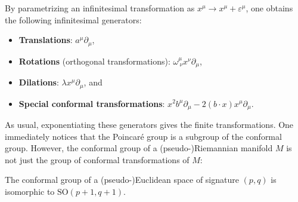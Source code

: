     By parametrizing an infinitesimal transformation as $x^\mu\rightarrow x^\mu+\varepsilon^\mu$, one obtains the following infinitesimal generators:
    \begin{itemize}
        \item\textbf{Translations}: $a^\mu\partial_\mu$,
        \item\textbf{Rotations} (orthogonal transformations): $\omega^\mu_{\ \nu}x^\nu\partial_\mu$,
        \item\textbf{Dilations}: $\lambda x^\mu\partial_\mu$, and
        \item\textbf{Special conformal transformations}: $x^2b^\mu\partial_\mu - 2(b\cdot x)x^\mu\partial_\mu$.
    \end{itemize}
    As usual, exponentiating these generators gives the finite transformations. One immediately notices that the Poincar\'e group is a subgroup of the conformal group. However, the conformal group of a (pseudo-)Riemannian manifold $M$ is not just the group of conformal transformations of $M$:
    \begin{property}\label{riemann:conformal_group}
        The conformal group of a (pseudo-)Euclidean space of signature $(p,q)$ is isomorphic to $\mathrm{SO}(p+1,q+1)$.
    \end{property}